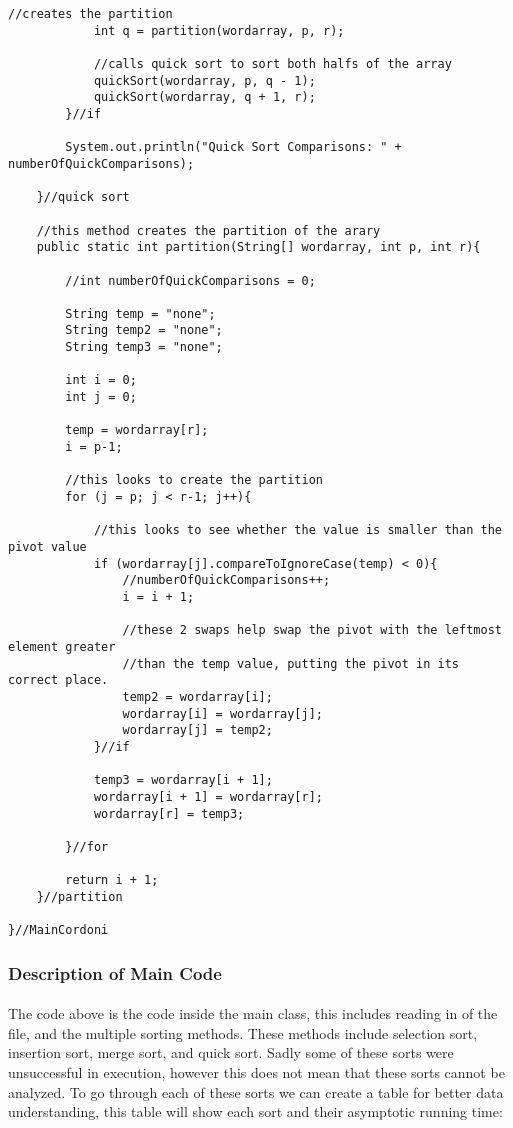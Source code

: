 \documentclass[letterpaper, 10pt,DIV=13]{scrartcl}
\numberwithin{equation}{section} %
\numberwithin{figure}{section} %
\numberwithin{table}{section} %
\begin{document}
\begin{lstlisting}[frame=single, ]
            //creates the partition
            int q = partition(wordarray, p, r);

            //calls quick sort to sort both halfs of the array
            quickSort(wordarray, p, q - 1);
            quickSort(wordarray, q + 1, r);
        }//if

        System.out.println("Quick Sort Comparisons: " + numberOfQuickComparisons);
       
    }//quick sort

    //this method creates the partition of the arary
    public static int partition(String[] wordarray, int p, int r){

        //int numberOfQuickComparisons = 0;

        String temp = "none";
        String temp2 = "none";
        String temp3 = "none";

        int i = 0;
        int j = 0;

        temp = wordarray[r];
        i = p-1;

        //this looks to create the partition
        for (j = p; j < r-1; j++){

            //this looks to see whether the value is smaller than the pivot value
            if (wordarray[j].compareToIgnoreCase(temp) < 0){
                //numberOfQuickComparisons++;
                i = i + 1;

                //these 2 swaps help swap the pivot with the leftmost element greater 
                //than the temp value, putting the pivot in its correct place.
                temp2 = wordarray[i];
                wordarray[i] = wordarray[j];
                wordarray[j] = temp2;
            }//if

            temp3 = wordarray[i + 1];
            wordarray[i + 1] = wordarray[r];
            wordarray[r] = temp3;

        }//for

        return i + 1;
    }//partition
    
}//MainCordoni
\end{lstlisting}

\subsubsection{Description of Main Code}
\paragraph{} The code above is the code inside the main class, this includes reading in of the file, and the multiple sorting methods. These methods include selection sort, insertion sort, merge sort, and quick sort. Sadly some of these sorts were unsuccessful in execution, however this does not mean that these sorts cannot be analyzed. To go through each of these sorts we can create a table for better data understanding, this table will show each sort and their asymptotic running time:
\end{document}
